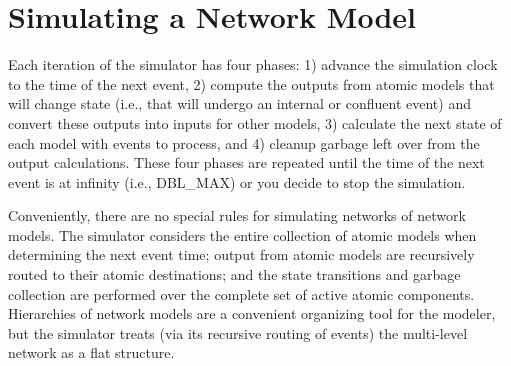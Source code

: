 \section{Simulating a Network Model}
Each iteration of the simulator has four phases: 1) advance the simulation clock to the time of the next event, 2) compute the outputs from atomic models that will change state (i.e., that will undergo an internal or confluent event) and convert these outputs into inputs for other models, 3) calculate the next state of each model with events to process, and 4) cleanup garbage left over from the output calculations. These four phases are repeated until the time of the next event is at infinity (i.e., DBL\_MAX) or you decide to stop the simulation. 

Conveniently, there are no special rules for simulating networks of network models. The simulator considers the entire collection of atomic models when determining the next event time; output from atomic models are recursively routed to their atomic destinations; and the state transitions and garbage collection are performed over the complete set of active atomic components. Hierarchies of network models are a convenient organizing tool for the modeler, but the simulator treats (via its recursive routing of events) the multi-level network as a flat structure.

